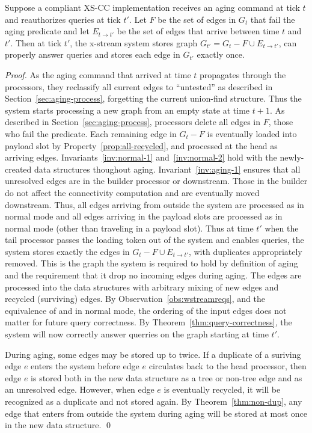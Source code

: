 \begin{theorem}
Suppose a compliant XS-CC implementation receives an aging command at tick $t$ and reauthorizes queries at tick $t'$.  Let $F$ be the set of edges in $G_t$ that fail the aging predicate and let $E_{t\rightarrow t'}$ be the set of edges that arrive between time $t$ and $t'$. Then at tick $t'$, the x-stream system stores graph $G_{t'} = G_t - F \cup E_{t\rightarrow t'}$, can properly answer queries and stores each edge in $G_{t'}$ exactly once.
\label{thm:aging-correctness}
\end{theorem}
\begin{proof}
As the aging command that arrived at time $t$ propagates through the
processors, they reclassify all current edges to ``untested'' as
described in Section~\ref{sec:aging-process}, forgetting the current
union-find structure. Thus the system starts processing a new graph
from an empty state at time $t+1$. As described in
Section~\ref{sec:aging-process}, processors delete all edges in $F$,
those who fail the predicate.  Each remaining edge in $G_t - F$ is
eventually loaded into payload slot by
Property~\ref{prop:all-recycled}, and processed at the head as
arriving edges. Invariants~\ref{inv:normal-1} and~\ref{inv:normal-2}
hold with the newly-created data structures thoughout aging.
Invariant~\ref{inv:aging-1} ensures that all unresolved edges are in
the builder processor or downstream. Those in the builder do not
affect the connectivity computation and are eventually moved
downstream. Thus, all edges arriving from outside the system are
processed as in normal mode and all edges arriving in the payload
slots are processed as in normal mode (other than traveling in a
payload slot).  Thus at time $t'$ when the tail processor passes the
loading token out of the system and enables queries, the \XStream
system stores exactly the edges in $G_t - F \cup E_{t\rightarrow t'}$,
with duplicates appropriately removed.  This is the graph the system
is required to hold by definition of aging and the requirement that it
drop no incoming edges during aging. The edges are processed into the
data structures with arbitrary mixing of new edges and recycled
(surviving) edges.  By Observation~\ref{obs:wstreamreqs}, and the equivalence of
\DFR and \XSCC in normal mode, the ordering of
the input edges does not matter for future query correctness.
By Theorem~\ref{thm:query-correctness}, the \XStream system will now correctly
answer querries on the graph starting at time $t'$.

During aging, some edges may be stored up to twice.  If a duplicate of a suriving edge $e$
enters the system before edge $e$ circulates back to the head processor, then edge $e$ is
stored both in the new data structure as a tree or non-tree edge and as an unresolved edge.
However, when edge $e$ is eventually recycled, it will be recognized as a duplicate and not
stored again.  By Theorem~\ref{thm:non-dup}, any edge that enters from outside the system during aging will be stored at most once in the new data structure.
\qed
\end{proof}

